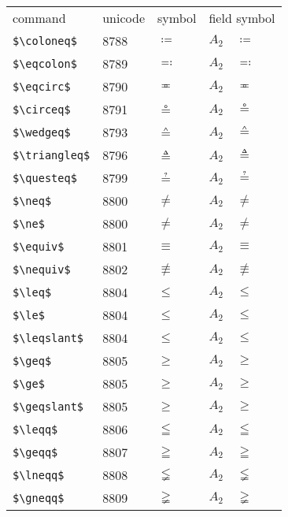 \documentclass{article}
\begin{document}
\begin{table}
\begin{center}
\begin{tabular}{llll}
 command               & unicode & symbol         & field symbol\\
 \verb#$\coloneq$#     & 8788    & $\coloneq$     & $A_2\quad \coloneq$\\
 \verb#$\eqcolon$#     & 8789    & $\eqcolon$     & $A_2\quad \eqcolon$\\
 \verb#$\eqcirc$#      & 8790    & $\eqcirc$      & $A_2\quad \eqcirc$\\
 \verb#$\circeq$#      & 8791    & $\circeq$      & $A_2\quad \circeq$\\
 \verb#$\wedgeq$#      & 8793    & $\wedgeq$      & $A_2\quad \wedgeq$\\
 \verb#$\triangleq$#   & 8796    & $\triangleq$   & $A_2\quad \triangleq$\\
 \verb#$\questeq$#     & 8799    & $\questeq$     & $A_2\quad \questeq$\\
 \verb#$\neq$#         & 8800    & $\neq$         & $A_2\quad \neq$\\
 \verb#$\ne$#          & 8800    & $\ne$          & $A_2\quad \ne$\\
 \verb#$\equiv$#       & 8801    & $\equiv$       & $A_2\quad \equiv$\\
 \verb#$\nequiv$#      & 8802    & $\nequiv$      & $A_2\quad \nequiv$\\
 \verb#$\leq$#         & 8804    & $\leq$         & $A_2\quad \leq$\\
 \verb#$\le$#          & 8804    & $\le$          & $A_2\quad \le$\\
 \verb#$\leqslant$#    & 8804    & $\leqslant$    & $A_2\quad \leqslant$\\
 \verb#$\geq$#         & 8805    & $\geq$         & $A_2\quad \geq$\\
 \verb#$\ge$#          & 8805    & $\ge$          & $A_2\quad \ge$\\
 \verb#$\geqslant$#    & 8805    & $\geqslant$    & $A_2\quad \geqslant$\\
 \verb#$\leqq$#        & 8806    & $\leqq$        & $A_2\quad \leqq$\\
 \verb#$\geqq$#        & 8807    & $\geqq$        & $A_2\quad \geqq$\\
 \verb#$\lneqq$#       & 8808    & $\lneqq$       & $A_2\quad \lneqq$\\
 \verb#$\gneqq$#       & 8809    & $\gneqq$       & $A_2\quad \gneqq$\\

\end{tabular}
\end{center}
\end{table}
\end{document}
